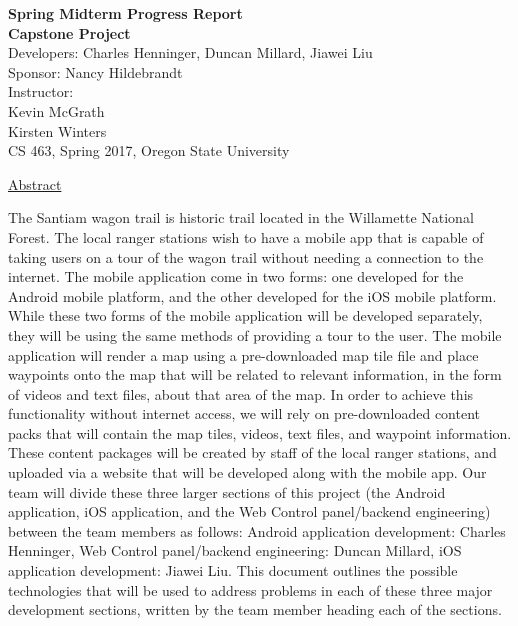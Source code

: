 \documentclass[letterpaper, 10pt,titlepage]{article}
\newcommand\tab[1][1cm]{\hspace*{#1}}
\begin{document}
\begin{titlepage}
\begin{center}
    \Huge
    \textbf{Spring Midterm Progress Report}\\
    \textbf{Capstone Project}\\
    \vspace{1.0cm}
    \large
    Developers: Charles Henninger, Duncan Millard, Jiawei Liu\\
    Sponsor: Nancy Hildebrandt\\
    \vspace{1.5cm}
    \large
    Instructor: \\
    Kevin McGrath\\
    Kirsten Winters \\

    \vspace{0.3cm}
    \large
    CS 463, Spring 2017, Oregon State University\\    

    \vspace{3.2cm}

    \large
    \underline{Abstract}\\
    \vspace{0.3cm}
    \end{center}
    \large

    \tab The Santiam wagon trail is historic trail located in the Willamette National Forest. The local ranger stations wish to have a mobile app that is capable of taking users on a tour of the wagon trail without needing a connection to the internet. The mobile application come in two forms: one developed for the Android mobile platform, and the other developed for the iOS mobile platform. While these two forms of the mobile application will be developed separately, they will be using the same methods of providing a tour to the user. The mobile application will render a map using a pre-downloaded map tile file and place waypoints onto the map that will be related to relevant information, in the form of videos and text files, about that area of the map. In order to achieve this functionality without internet access, we will rely on pre-downloaded content packs that will contain the map tiles, videos, text files, and waypoint information. These content packages will be created by staff of the local ranger stations, and uploaded via a website that will be developed along with the mobile app. Our team will divide these three larger sections of this project (the Android application, iOS application, and the Web Control panel/backend engineering) between the team members as follows: Android application development: Charles Henninger, Web Control panel/backend engineering: Duncan Millard, iOS application development: Jiawei Liu. This document outlines the possible technologies that will be used to address problems in each of these three major development sections, written by the team member heading each of the sections.
    

\end{titlepage}
\end{document}

